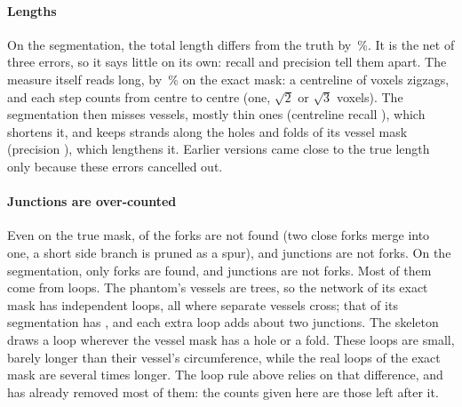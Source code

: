 \begin{table}[ht]
  \centering
  \small
  
  \caption{The network of the branching phantom, measured on its true mask and on its segmentation.
    Recall: share of the true centrelines found; precision: share of the measured centrelines that are
    true. \emph{Forks}: true bifurcations found; \emph{not forks}: other measured junctions;
    \emph{crossings}: junctions where two separate vessels touch (real junctions of the mask, not
    bifurcations). Length: measured / true (the vessels an image can show); radius: median offset
    from the true radius.}
  \label{tab:network-scores}
\end{table}

\paragraph{Lengths} On the segmentation, the total length differs from the truth by
\pbValueNetSegLengthErrorPct\,\%. It is the net of three errors, so it says little on its own: recall
and precision tell them apart. The measure itself reads long, by \pbValueNetTrueLengthErrorPct\,\% on the
exact mask: a centreline of voxels zigzags, and each step counts from centre to centre (one, $\sqrt2$
or $\sqrt3$ voxels). The segmentation then misses vessels, mostly thin ones (centreline recall
\pbValueNetSegRecall), which shortens it, and keeps strands along the holes and folds of its vessel mask
(precision \pbValueNetSegPrecision), which lengthens it. Earlier versions came close to the true
length only because these errors cancelled out.

\paragraph{Junctions are over-counted} Even on the true mask, \pbValueNetTrueMaskMissed{} of the \pbValueNetTrueForks{} forks are not
found (two close forks merge into one, a short side branch is pruned as a spur), and
\pbValueNetTrueMaskSpurious{} junctions are not forks. On the segmentation, only \pbValueNetSegForks{}
forks are found, and \pbValueNetSegSpurious{} junctions are not forks. Most of them come from loops.
The phantom's vessels are trees, so the network of its exact mask has \pbValueNetTrueMaskCycles{}
independent loops, all where separate vessels cross; that of its segmentation has
\pbValueNetSegCycles, and each extra loop adds about two junctions. The skeleton draws a loop wherever
the vessel mask has a hole or a fold. These loops are small, barely longer than their vessel's
circumference, while the real loops of the exact mask are several times longer. The loop rule above
relies on that difference, and has already removed most of them: the counts given here are those left
after it.

